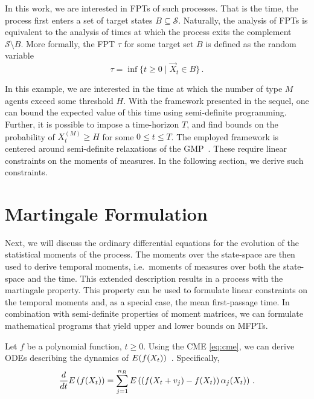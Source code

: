 In this work, we are interested in \acfp{FPT} of such processes.
That is the time, the process first enters a set of target states
$B\subseteq \mathcal{S}$. Naturally, the analysis of \acp{FPT} is
equivalent
to the analysis of times at which the process exits the complement $\mathcal{S}\setminus B$.
More formally, the \acl{FPT} $\tau$ for
some target set $B$ is defined as the random variable
\begin{equation}\label{eq:fpt_def}
    \tau = \inf\{t\geq 0\mid \vec X_t \in B\}\,.
\end{equation}


In this example, we are interested in the time at which the number of type $M$ agents
exceed some threshold $H$.
With the framework presented in the sequel, one can bound the expected value
of this time using semi-definite programming.
Further, it is possible to impose a time-horizon $T$, and find bounds
on the probability of $ X_t^{(M)}\geq H$ for some $0\leq t\leq T$.
The employed framework is centered around semi-definite relaxations
of the \ac{GMP}~\parencite{lasserre2010moments}.
These require linear constraints on the moments of measures.
In the following section, we derive such constraints.

\section{Martingale Formulation}\label{sec:mfpt:moments}
Next, we will discuss the ordinary differential equations for the evolution of the statistical moments of
the process.
The moments over the state-space are then used to derive temporal moments, i.e.\ moments
of measures over both the state-space and the time.
This extended description results in a process with the martingale property.
This property can be used to formulate linear constraints on the temporal moments
and, as a special case, the mean first-passage time.
In combination with semi-definite properties of moment matrices, we can formulate
mathematical programs that yield upper and lower bounds on \aclp{MFPT}\@.


Let $f$ be a polynomial function, $t\ge0$.
Using the \ac{CME} \eqref{eq:cme}, we can derive \acp{ODE}
describing the dynamics of ${E}(f(X_t))$~\parencite{engblom2006computing}.
Specifically,
\begin{equation}\label{eq:mfpt:mom_ode}
    \frac{d}{dt}{E}\left(f(X_t)\right) = \sum_{j=1}^{n_R}{E}\left(\left(f({X_t +
    v_j}) - f(X_t)\right)\alpha_j(X_t)\right)\,.
\end{equation}

